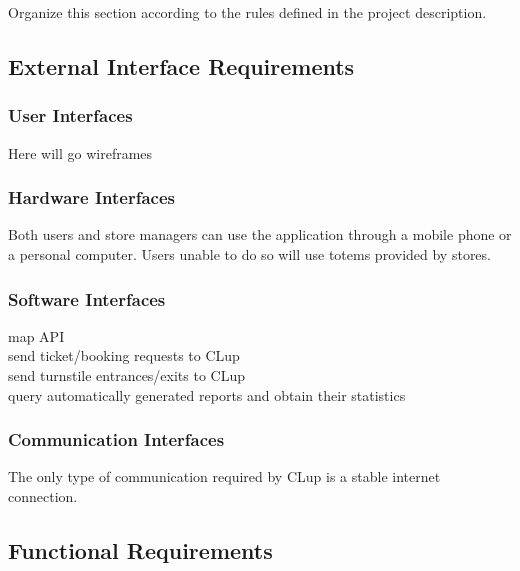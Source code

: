 Organize this section according to the rules defined in the project description. \\ 

\subsection{External Interface Requirements}

\subsubsection{User Interfaces}
Here will go wireframes
\subsubsection{Hardware Interfaces}
Both users and store managers can use the application through a mobile phone or a personal computer. Users unable to do so will use totems provided by stores.
\subsubsection{Software Interfaces}
map API\\
send ticket/booking requests to CLup\\
send turnstile entrances/exits to CLup\\
query automatically generated reports and obtain their statistics\\
\subsubsection{Communication Interfaces}
The only type of communication required by CLup is a stable internet connection.
\subsection{Functional Requirements}

